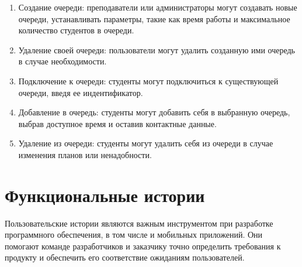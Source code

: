 \begin{enumerate}
    \item Создание очереди: преподаватели или администраторы
			могут создавать новые очереди, устанавливать параметры,
			такие как время работы и максимальное количество студентов
			в очереди.
    \item Удаление своей очереди: пользователи могут удалить созданную
		ими очередь в случае необходимости.
    \item Подключение к очереди: студенты могут подключиться
		к существующей очереди, введя ее индентификатор.
    \item Добавление в очередь: студенты могут добавить себя в выбранную
		очередь, выбрав доступное время и оставив контактные данные.
    \item Удаление из очереди: студенты могут удалить себя из очереди
		в случае изменения планов или ненадобности.
\end{enumerate}

\section{Функциональные истории}

Пользовательские истории являются важным инструментом
при разработке программного обеспечения, в том числе и мобильных приложений.
Они помогают команде разработчиков и заказчику точно определить требования
к продукту и обеспечить его соответствие ожиданиям пользователей.

